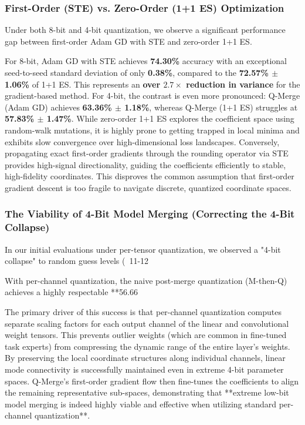 \subsubsection{First-Order (STE) vs. Zero-Order (1+1 ES) Optimization}
Under both 8-bit and 4-bit quantization, we observe a significant performance gap between first-order Adam GD with STE and zero-order 1+1 ES. 

For 8-bit, Adam GD with STE achieves \textbf{74.30\%} accuracy with an exceptional seed-to-seed standard deviation of only \textbf{0.38\%}, compared to the \textbf{72.57\% $\pm$ 1.06\%} of 1+1 ES. This represents an \textbf{over $2.7\times$ reduction in variance} for the gradient-based method. 
For 4-bit, the contrast is even more pronounced: Q-Merge (Adam GD) achieves \textbf{63.36\% $\pm$ 1.18\%}, whereas Q-Merge (1+1 ES) struggles at \textbf{57.83\% $\pm$ 1.47\%}. 
While zero-order 1+1 ES explores the coefficient space using random-walk mutations, it is highly prone to getting trapped in local minima and exhibits slow convergence over high-dimensional loss landscapes. Conversely, propagating exact first-order gradients through the rounding operator via STE provides high-signal directionality, guiding the coefficients efficiently to stable, high-fidelity coordinates. This disproves the common assumption that first-order gradient descent is too fragile to navigate discrete, quantized coordinate spaces.

\subsubsection{The Viability of 4-Bit Model Merging (Correcting the 4-Bit Collapse)}
In our initial evaluations under per-tensor quantization, we observed a "4-bit collapse" to random guess levels (~11-12%

With per-channel quantization, the naive post-merge quantization (M-then-Q) achieves a highly respectable **56.66%

The primary driver of this success is that per-channel quantization computes separate scaling factors for each output channel of the linear and convolutional weight tensors. This prevents outlier weights (which are common in fine-tuned task experts) from compressing the dynamic range of the entire layer's weights. By preserving the local coordinate structures along individual channels, linear mode connectivity is successfully maintained even in extreme 4-bit parameter spaces. Q-Merge's first-order gradient flow then fine-tunes the coefficients to align the remaining representative sub-spaces, demonstrating that **extreme low-bit model merging is indeed highly viable and effective when utilizing standard per-channel quantization**.

